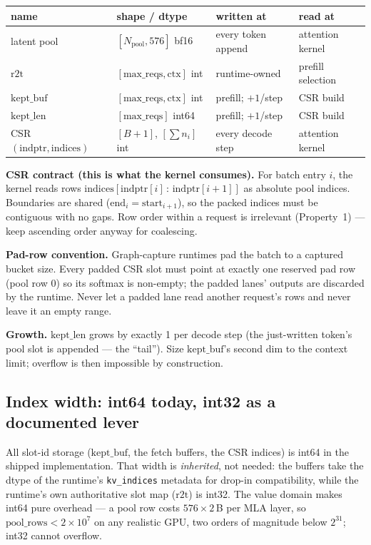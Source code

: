 \documentclass[11pt]{article}
\begin{document}
\begin{center}
\small
\begin{tabular}{@{}llll@{}}
\toprule
name & shape / dtype & written at & read at\\
\midrule
latent pool & $[N_{\mathrm{pool}}, 576]$ bf16 & every token append & attention kernel\\
$\mathrm{r2t}$ & $[\mathrm{max\_reqs}, \mathrm{ctx}]$ int & runtime-owned & prefill selection\\
$\mathrm{kept\_buf}$ & $[\mathrm{max\_reqs}, \mathrm{ctx}]$ int & prefill; $+1$/step & CSR build\\
$\mathrm{kept\_len}$ & $[\mathrm{max\_reqs}]$ int64 & prefill; $+1$/step & CSR build\\
CSR $(\mathrm{indptr}, \mathrm{indices})$ & $[B{+}1]$, $[\sum n_i]$ int & every decode step & attention kernel\\
\bottomrule
\end{tabular}
\end{center}

\textbf{CSR contract (this is what the kernel consumes).} For batch entry
$i$, the kernel reads rows
$\mathrm{indices}[\mathrm{indptr}[i] \,:\, \mathrm{indptr}[i{+}1]]$ as
absolute pool indices. Boundaries are shared
($\mathrm{end}_i = \mathrm{start}_{i+1}$), so the packed indices must be
contiguous with no gaps. Row order within a request is irrelevant
(Property~1) --- keep ascending order anyway for coalescing.

\textbf{Pad-row convention.} Graph-capture runtimes pad the batch to a
captured bucket size. Every padded CSR slot must point at exactly one
reserved pad row (pool row 0) so its softmax is non-empty; the padded lanes'
outputs are discarded by the runtime. Never let a padded lane read another
request's rows and never leave it an empty range.

\textbf{Growth.} $\mathrm{kept\_len}$ grows by exactly 1 per decode step
(the just-written token's pool slot is appended --- the ``tail''). Size
$\mathrm{kept\_buf}$'s second dim to the context limit; overflow is then
impossible by construction.

\subsection{Index width: int64 today, int32 as a documented lever}
\label{sec:idxwidth}

All slot-id storage ($\mathrm{kept\_buf}$, the fetch buffers, the CSR
indices) is int64 in the shipped implementation. That width is
\emph{inherited}, not needed: the buffers take the dtype of the runtime's
\texttt{kv\_indices} metadata for drop-in compatibility, while the
runtime's own authoritative slot map ($\mathrm{r2t}$) is int32. The value
domain makes int64 pure overhead --- a pool row costs $576\times2$\,B per
MLA layer, so $\mathrm{pool\_rows} < 2\times10^{7}$ on any realistic GPU,
two orders of magnitude below $2^{31}$; int32 cannot overflow.
\end{document}
